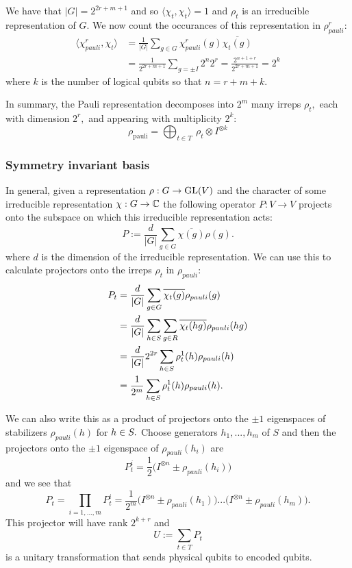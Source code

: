 \documentclass[12pt]{article}
\begin{document}
We have that $|G|=2^{2r+m+1}$ and so
$\langle\chi_{t},\chi_{t}\rangle = 1$ and
$\rho_t$ is an irreducible representation of $G.$
We now count the occurances of 
this representation in $\rho^r_{pauli}$:
\begin{align*}
\langle\chi^r_{pauli},\chi_{t}\rangle &= \frac{1}{|G|}\sum_{g\in G} \chi^r_{pauli}(g)\overline{\chi_{t}(g)} \\
&= \frac{1}{2^{2r+m+1}} \sum_{g=\pm I} 2^n 2^r = \frac{2^{n+1+r}}{2^{2r+m+1}} = 2^k
\end{align*}
where $k$ is the number of logical qubits so that $n=r+m+k.$

In summary, the Pauli representation decomposes into 
$2^m$ many irreps $\rho_t,$ 
each with dimension $2^r,$ 
and appearing with multiplicity $2^k:$
$$
    \rho_{\mathrm{pauli}} = 
        \bigoplus_{t\in T}\ \rho_t \otimes I^{\otimes k}
$$

\subsubsection{Symmetry invariant basis}

In general, given a representation $\rho:G\to \mathrm{GL}(V)$
and the character of some irreducible representation $\chi:G\to \mathbb{C}$
the following operator 
$P:V\to V$
projects onto the subspace on which
this irreducible representation acts:
$$
    P := \frac{d}{|G|} \sum_{g\in G} {\overline{\chi(g)}} \rho(g).
$$
where $d$ is the dimension of the irreducible representation.
We can use this to calculate projectors onto the irreps $\rho_t$ in $\rho_{pauli}$:
\begin{align*}
P_t &= \frac{d}{|G|} \sum_{g\in G} \overline{\chi_t(g)} \rho_{pauli}(g) \\
    &= \frac{d}{|G|} \sum_{h\in S}\sum_{g\in R} \overline{\chi_t(hg)} \rho_{pauli}(hg) \\
    &= \frac{d}{|G|} 2^{2r} \sum_{h\in S} {\rho^1_t(h)} \rho_{pauli}(h) \\
    &= \frac{1}{2^m} \sum_{h\in S} {\rho^1_t(h)} \rho_{pauli}(h).
\end{align*}

We can also write this as a product of projectors onto
the $\pm 1$ eigenspaces of stabilizers $\rho_{pauli}(h)$ for $h\in S.$
Choose generators $h_1,...,h_m$ of $S$
and then the projectors onto the $\pm 1$ eigenspace of $\rho_{pauli}(h_i)$ are
$$
P^i_t = \frac{1}{2} \bigl(I^{\otimes n} \pm \rho_{pauli}(h_i) \bigr)
$$
and we see that 
$$
P_t = \prod_{i=1,...,m} P^i_t 
    = \frac{1}{2^m} \bigl(I^{\otimes n} \pm \rho_{pauli}(h_1)\bigr)
    ...\bigl(I^{\otimes n} \pm \rho_{pauli}(h_m)\bigr).
$$
This projector will have rank $2^{k+r}$ and
$$
U := \sum_{t\in T} P_t
$$
is a unitary transformation that sends
physical qubits to encoded qubits.
\end{document}
